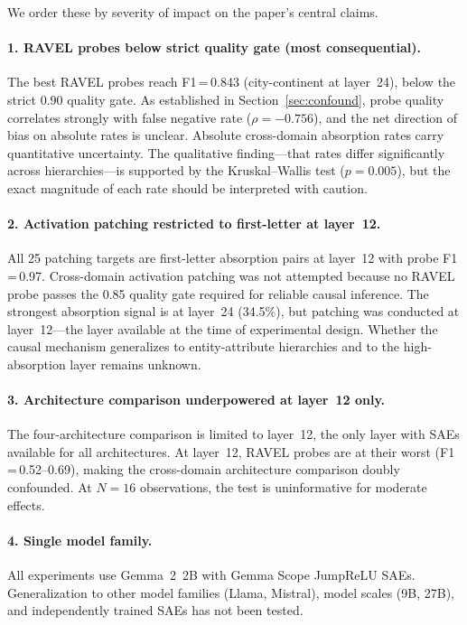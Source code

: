 \documentclass{article}
\begin{document}
We order these by severity of impact on the paper's central claims.

\paragraph{1. RAVEL probes below strict quality gate (most consequential).} The best RAVEL probes reach F1\,=\,0.843 (city-continent at layer~24), below the strict 0.90 quality gate. As established in Section~\ref{sec:confound}, probe quality correlates strongly with false negative rate ($\rho = -0.756$), and the net direction of bias on absolute rates is unclear. Absolute cross-domain absorption rates carry quantitative uncertainty. The qualitative finding---that rates differ significantly across hierarchies---is supported by the Kruskal--Wallis test ($p = 0.005$), but the exact magnitude of each rate should be interpreted with caution.

\paragraph{2. Activation patching restricted to first-letter at layer~12.} All 25 patching targets are first-letter absorption pairs at layer~12 with probe F1\,=\,0.97. Cross-domain activation patching was not attempted because no RAVEL probe passes the 0.85 quality gate required for reliable causal inference. The strongest absorption signal is at layer~24 (34.5\%), but patching was conducted at layer~12---the layer available at the time of experimental design. Whether the causal mechanism generalizes to entity-attribute hierarchies and to the high-absorption layer remains unknown.

\paragraph{3. Architecture comparison underpowered at layer~12 only.} The four-architecture comparison is limited to layer~12, the only layer with SAEs available for all architectures. At layer~12, RAVEL probes are at their worst (F1\,=\,0.52--0.69), making the cross-domain architecture comparison doubly confounded. At $N = 16$ observations, the test is uninformative for moderate effects.

\paragraph{4. Single model family.} All experiments use Gemma~2~2B with Gemma Scope JumpReLU SAEs. Generalization to other model families (Llama, Mistral), model scales (9B, 27B), and independently trained SAEs has not been tested.
\end{document}
